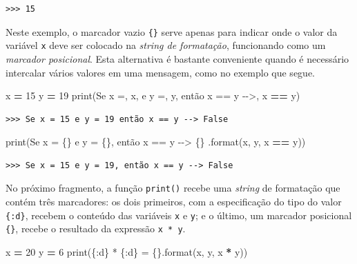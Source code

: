 \documentclass[
]{book}
\newenvironment{Shaded}{\begin{snugshade}}{\end{snugshade}}
\newcommand{\BuiltInTok}[1]{#1}
\newcommand{\DecValTok}[1]{\textcolor[rgb]{0.00,0.00,0.81}{#1}}
\newcommand{\NormalTok}[1]{#1}
\newcommand{\OperatorTok}[1]{\textcolor[rgb]{0.81,0.36,0.00}{\textbf{#1}}}
\newcommand{\SpecialCharTok}[1]{\textcolor[rgb]{0.00,0.00,0.00}{#1}}
\newcommand{\StringTok}[1]{\textcolor[rgb]{0.31,0.60,0.02}{#1}}
\begin{document}
\begin{verbatim}
>>> 15
\end{verbatim}

Neste exemplo, o marcador vazio \texttt{\{\}} serve apenas para indicar onde o valor da variável \texttt{x} deve ser colocado na \emph{string de formatação}, funcionando como um \emph{marcador posicional}. Esta alternativa é bastante conveniente quando é necessário intercalar vários valores em uma mensagem, como no exemplo que segue.

\begin{Shaded}
\begin{Highlighting}[]
\NormalTok{x }\OperatorTok{=} \DecValTok{15}
\NormalTok{y }\OperatorTok{=} \DecValTok{19}
\BuiltInTok{print}\NormalTok{(}\StringTok{\textquotesingle{}Se x =\textquotesingle{}}\NormalTok{, x, }\StringTok{\textquotesingle{}e y =\textquotesingle{}}\NormalTok{, y, }\StringTok{\textquotesingle{}então x == y {-}{-}\textgreater{}\textquotesingle{}}\NormalTok{,}
\NormalTok{  x }\OperatorTok{==}\NormalTok{ y)}
\end{Highlighting}
\end{Shaded}

\begin{verbatim}
>>> Se x = 15 e y = 19 então x == y --> False
\end{verbatim}

\begin{Shaded}
\begin{Highlighting}[]
\BuiltInTok{print}\NormalTok{(}\StringTok{\textquotesingle{}Se x = }\SpecialCharTok{\{\}}\StringTok{ e y = }\SpecialCharTok{\{\}}\StringTok{, então x == y {-}{-}\textgreater{} }\SpecialCharTok{\{\}}\StringTok{\textquotesingle{}}
\NormalTok{  .}\BuiltInTok{format}\NormalTok{(x, y, x }\OperatorTok{==}\NormalTok{ y))}
\end{Highlighting}
\end{Shaded}

\begin{verbatim}
>>> Se x = 15 e y = 19, então x == y --> False
\end{verbatim}

No próximo fragmento, a função \texttt{print()} recebe uma \emph{string} de formatação que contém três marcadores: os dois primeiros, com a especificação do tipo do valor \texttt{\{:d\}}, recebem o conteúdo das variáveis \texttt{x} e \texttt{y}; e o último, um marcador posicional \texttt{\{\}}, recebe o resultado da expressão \texttt{x\ *\ y}.

\begin{Shaded}
\begin{Highlighting}[]
\NormalTok{x }\OperatorTok{=} \DecValTok{20}
\NormalTok{y }\OperatorTok{=} \DecValTok{6}
\BuiltInTok{print}\NormalTok{(}\StringTok{\textquotesingle{}}\SpecialCharTok{\{:d\}}\StringTok{ * }\SpecialCharTok{\{:d\}}\StringTok{ = }\SpecialCharTok{\{\}}\StringTok{\textquotesingle{}}\NormalTok{.}\BuiltInTok{format}\NormalTok{(x, y, x }\OperatorTok{*}\NormalTok{ y))}
\end{Highlighting}
\end{Shaded}
\end{document}

